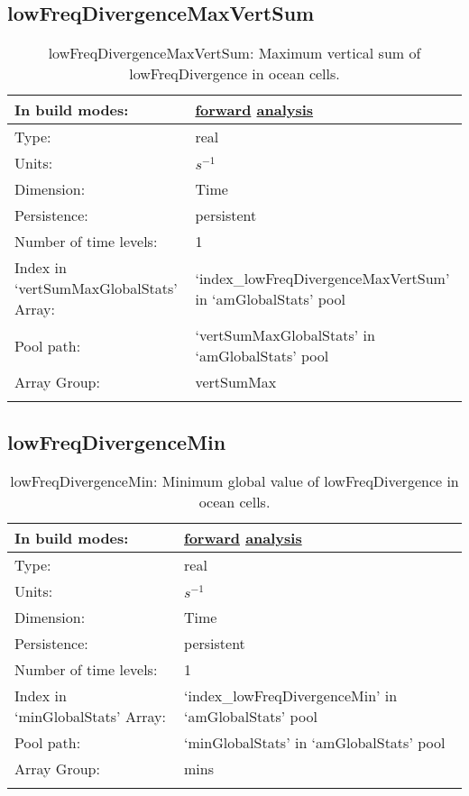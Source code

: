 \subsection[lowFreqDivergenceMaxVertSum]{lowFreqDivergenceMaxVertSum}
\label{subsec:var_sec_amGlobalStats_lowFreqDivergenceMaxVertSum}
\begin{center}
\begin{longtable}{| p{2.0in} | p{4.0in} |}
        \hline 
        In build modes: & \hyperref[subsec:forward_var_tab_amGlobalStats]{forward} \hyperref[subsec:analysis_var_tab_amGlobalStats]{analysis} \\
        \hline 
        Type: & real \\
        \hline 
        Units: & $s^{-1}$ \\
        \hline 
        Dimension: & Time \\
        \hline 
        Persistence: & persistent \\
        \hline 
        Number of time levels: & 1 \\
        \hline 
		 Index in `vertSumMaxGlobalStats' Array: & `index\_lowFreqDivergenceMaxVertSum' in `amGlobalStats' pool \\
		 \hline 
            Pool path: & `vertSumMaxGlobalStats' in `amGlobalStats' pool \\
		 \hline 
		 Array Group: & vertSumMax \\
		 \hline 
    \caption{lowFreqDivergenceMaxVertSum: Maximum vertical sum of lowFreqDivergence in ocean cells.}
\end{longtable}
\end{center}
\subsection[lowFreqDivergenceMin]{lowFreqDivergenceMin}
\label{subsec:var_sec_amGlobalStats_lowFreqDivergenceMin}
\begin{center}
\begin{longtable}{| p{2.0in} | p{4.0in} |}
        \hline 
        In build modes: & \hyperref[subsec:forward_var_tab_amGlobalStats]{forward} \hyperref[subsec:analysis_var_tab_amGlobalStats]{analysis} \\
        \hline 
        Type: & real \\
        \hline 
        Units: & $s^{-1}$ \\
        \hline 
        Dimension: & Time \\
        \hline 
        Persistence: & persistent \\
        \hline 
        Number of time levels: & 1 \\
        \hline 
		 Index in `minGlobalStats' Array: & `index\_lowFreqDivergenceMin' in `amGlobalStats' pool \\
		 \hline 
            Pool path: & `minGlobalStats' in `amGlobalStats' pool \\
		 \hline 
		 Array Group: & mins \\
		 \hline 
    \caption{lowFreqDivergenceMin: Minimum global value of lowFreqDivergence in ocean cells.}
\end{longtable}
\end{center}
